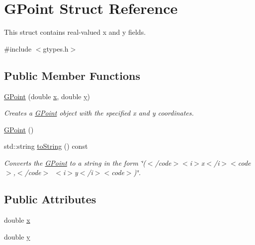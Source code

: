 \hypertarget{structGPoint}{}\section{G\+Point Struct Reference}
\label{structGPoint}


This struct contains real-\/valued x and y fields.  




{\ttfamily \#include $<$gtypes.\+h$>$}

\subsection*{Public Member Functions}
\begin{DoxyCompactItemize}
\item 
\mbox{\hyperlink{structGPoint_af53a9d37dc824c0280f0cc05ae265f14}{G\+Point}} (double \mbox{\hyperlink{structGPoint_af88b946fb90d5f08b5fb740c70e98c10}{x}}, double \mbox{\hyperlink{structGPoint_ab927965981178aa1fba979a37168db2a}{y}})
\begin{DoxyCompactList}\small\item\em Creates a {\ttfamily \mbox{\hyperlink{structGPoint}{G\+Point}}} object with the specified {\ttfamily x} and {\ttfamily y} coordinates. \end{DoxyCompactList}\item 
\mbox{\hyperlink{structGPoint_a70204c3be75958419dddc2c8dc4a4805}{G\+Point}} ()
\item 
std\+::string \mbox{\hyperlink{structGPoint_a1fe5121d6528fdea3f243321b3fa3a49}{to\+String}} () const
\begin{DoxyCompactList}\small\item\em Converts the {\ttfamily \mbox{\hyperlink{structGPoint}{G\+Point}}} to a string in the form {\ttfamily \char`\"{}($<$/code$>$$<$i$>$x$<$/i$>$$<$code$>$,$<$/code$>$~$<$i$>$y$<$/i$>$$<$code$>$)\char`\"{}}. \end{DoxyCompactList}\end{DoxyCompactItemize}
\subsection*{Public Attributes}
\begin{DoxyCompactItemize}
\item 
double \mbox{\hyperlink{structGPoint_af88b946fb90d5f08b5fb740c70e98c10}{x}}
\item 
double \mbox{\hyperlink{structGPoint_ab927965981178aa1fba979a37168db2a}{y}}
\end{DoxyCompactItemize}


